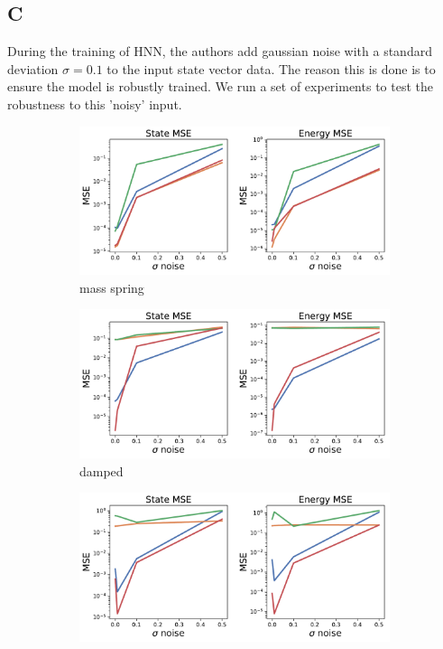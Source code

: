 \documentclass{article}
\begin{document}
\subsection*{C}
During the training of HNN, the authors add gaussian noise with a standard deviation $\sigma=0.1$ to the input state vector data. The reason this is done is to ensure the model is robustly trained. We run a set of experiments to test the robustness to this 'noisy' input. 
\begin{figure}[h!]
\centering
\captionsetup{justification=centering}
\begin{subfigure}[b]{0.42\textwidth}
\includegraphics[width=\textwidth]{figures/figures/mass_spring/1/mass_spring_noise_scaling.pdf}
\caption{mass spring}
\end{subfigure}
\begin{subfigure}[b]{0.42\textwidth}
\includegraphics[width=\textwidth]{figures/figures/damped/1/damped_noise_scaling.pdf}
\caption{damped}
\end{subfigure}
\begin{subfigure}[b]{0.42\textwidth}
\includegraphics[width=\textwidth]{figures/figures/forced_mass_spring/1/forced_mass_spring_noise_scaling.pdf}

\end{subfigure}
\end{figure}
\end{document}
